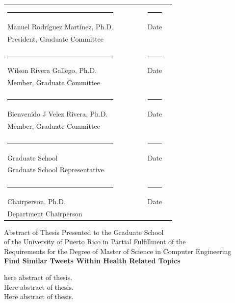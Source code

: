 \documentclass[12pt]{report}
\begin{document}
\begin{titlepage}
\begin{tabular}{l c c c c c r}
      \rule{2.5in}{.1pt} & & & &  &\rule{2in}{.1pt}\\
      Manuel Rodr\'iguez Mart\'inez, Ph.D. & & & &  &Date\\
      President, Graduate Committee\\
      \vspace{.3cm}\\
      \rule{2.5in}{.1pt}& & & &  &\rule{2in}{.1pt}\\
      Wilson Rivera Gallego, Ph.D. & & & &  &Date\\
      Member, Graduate Committee\\
      \vspace{.3cm}\\
      \rule{2.5in}{.1pt} & & & &  &\rule{2in}{.1pt}\\
      Bienvenido J Velez Rivera, Ph.D. & & & &  &Date\\
      Member, Graduate Committee\\
      \vspace{.45cm}\\
      \rule{2.5in}{.1pt} & & & &  &\rule{2in}{.1pt}\\
      Graduate School & & & &  &Date\\
      Graduate School Representative\\
      \vspace{.45cm}\\
      \rule{2.5in}{.1pt} & & & &  &\rule{2in}{.1pt}\\
      Chairperson, Ph.D. & & & &  &Date\\
      Department Chairperson \\
    \end{tabular}
\end{titlepage}

\setcounter{page}{2}

\begin{center}
\doublespacing
Abstract of Thesis Presented to the Graduate School\\
of the University of Puerto Rico in Partial Fulfillment of the\\
Requirements for the Degree of Master of Science in Computer Engineering\\
\vspace{.1cm}
\large\textbf {Find Similar Tweets Within Health Related Topics}
\end{center}
\doublespacing
here abstract of thesis.\\
Here abstract of thesis.\\	
Here abstract of thesis.\\
\par
\clearpage
\end{document}
